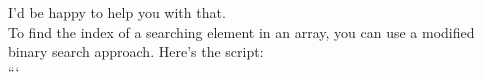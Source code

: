 \documentclass[preview]{standalone}
\begin{document}
I'd be happy to help you with that.\\To find the index of a searching element in an array, you can use a modified binary search approach. Here's the script:\\```\\
\end{document}
